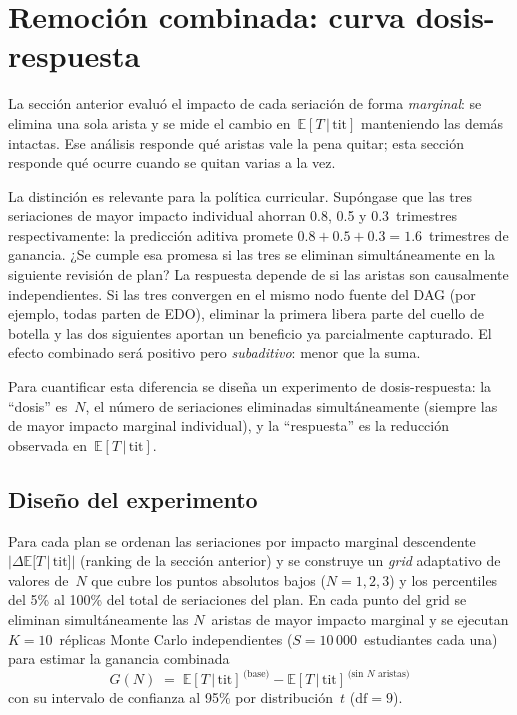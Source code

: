 \documentclass[11pt,letterpaper]{article}
\newcommand{\ETtit}{\mathbb{E}[T\,|\,\mathrm{tit}]}
\begin{document}
\section{Remoción combinada: curva dosis-respuesta}
\label{sec:dosis_respuesta}

La sección anterior evaluó el impacto de cada seriación de forma
\emph{marginal}: se elimina una sola arista y se mide el cambio en~$\ETtit$
manteniendo las demás intactas.
Ese análisis responde qué aristas vale la pena quitar; esta sección responde
qué ocurre cuando se quitan varias a la vez.

La distinción es relevante para la política curricular.
Supóngase que las tres seriaciones de mayor impacto individual ahorran
0.8, 0.5 y 0.3~trimestres respectivamente: la predicción aditiva promete
$0.8 + 0.5 + 0.3 = 1.6$~trimestres de ganancia.
¿Se cumple esa promesa si las tres se eliminan simultáneamente en la siguiente
revisión de plan?
La respuesta depende de si las aristas son causalmente independientes.
Si las tres convergen en el mismo nodo fuente del DAG (por ejemplo, todas
parten de EDO), eliminar la primera libera parte del cuello de botella y las
dos siguientes aportan un beneficio ya parcialmente capturado.
El efecto combinado será positivo pero \emph{subaditivo}: menor que la suma.

Para cuantificar esta diferencia se diseña un experimento de dosis-respuesta:
la ``dosis'' es~$N$, el número de seriaciones eliminadas simultáneamente
(siempre las de mayor impacto marginal individual), y la ``respuesta'' es la
reducción observada en~$\ETtit$.

\subsection{Diseño del experimento}

Para cada plan se ordenan las seriaciones por impacto marginal descendente
$|\Delta\ETtit|$ (ranking de la sección anterior) y se construye un
\emph{grid} adaptativo de valores de~$N$ que cubre los puntos absolutos bajos
($N = 1, 2, 3$) y los percentiles del 5\% al 100\% del total de
seriaciones del plan.
En cada punto del grid se eliminan simultáneamente las $N$~aristas de mayor
impacto marginal y se ejecutan $K = 10$~réplicas Monte Carlo independientes
($S = 10\,000$~estudiantes cada una) para estimar la ganancia combinada
\begin{equation}
  G(N) \;=\; \ETtit^{\,\text{(base)}} - \ETtit^{\,\text{(sin $N$ aristas)}}
  \label{eq:ganancia}
\end{equation}
con su intervalo de confianza al 95\% por distribución~$t$ ($\mathrm{df}=9$).
\end{document}
